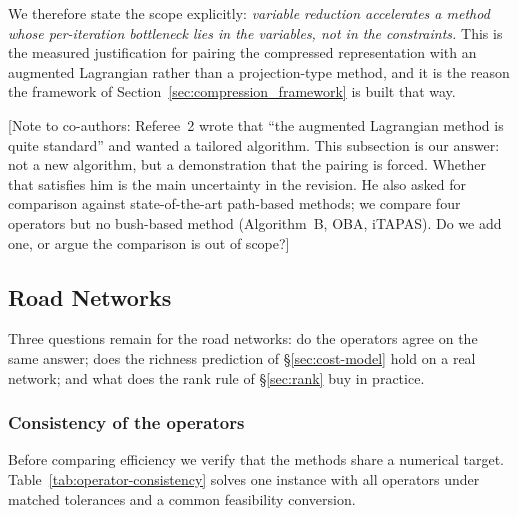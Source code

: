 \documentclass[11pt]{article}
\newcommand{\conote}[1]{{\color{red}\small\textsf{[Note to co-authors: #1]}}}
\begin{document}
We therefore state the scope explicitly: \emph{variable reduction accelerates a method whose
per-iteration bottleneck lies in the variables, not in the constraints.} This is the
measured justification for pairing the compressed representation with an augmented Lagrangian
rather than a projection-type method, and it is the reason the framework of
Section~\ref{sec:compression_framework} is built that way.

\conote{Referee~2 wrote that ``the augmented Lagrangian method is quite standard'' and wanted
a tailored algorithm. This subsection is our answer: not a new algorithm, but a demonstration
that the pairing is forced. Whether that satisfies him is the main uncertainty in the
revision. He also asked for comparison against state-of-the-art path-based methods; we compare
four operators but no bush-based method (Algorithm~B, OBA, iTAPAS). Do we add one, or argue
the comparison is out of scope?}


\subsection{Road Networks}
\label{sec:road-networks}


Three questions remain for the road networks: do the operators agree on the same answer; does
the richness prediction of \S\ref{sec:cost-model} hold on a real network; and what does the
rank rule of \S\ref{sec:rank} buy in practice.


\subsubsection*{Consistency of the operators}


Before comparing efficiency we verify that the methods share a numerical target.
Table~\ref{tab:operator-consistency} solves one instance with all operators under matched
tolerances and a common feasibility conversion.
\end{document}
